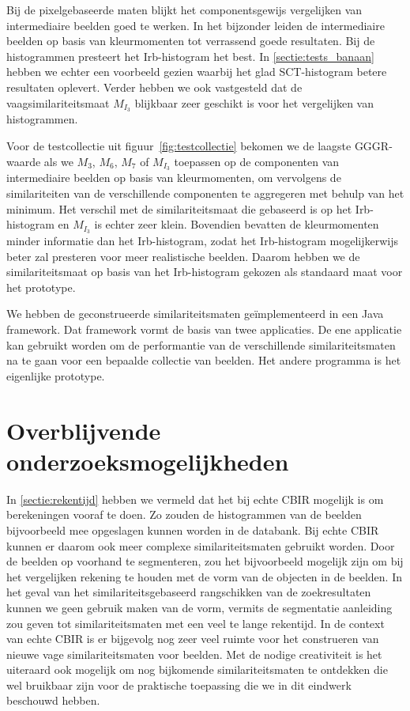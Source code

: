 Bij de pixelgebaseerde maten blijkt het componentsgewijs vergelijken van intermediaire
beelden goed te werken. In het bijzonder leiden de intermediaire beelden op basis van 
kleurmomenten tot verrassend goede resultaten. Bij de histogrammen presteert het 
Irb-histogram het best. In \ref{sectie:tests_banaan} hebben we echter een voorbeeld 
gezien waarbij het glad SCT-histogram betere resultaten oplevert. Verder hebben we
ook vastgesteld dat de vaagsimilariteitsmaat $M_{I_3}$ blijkbaar zeer 
geschikt is voor het vergelijken van histogrammen.

Voor de testcollectie uit figuur~\ref{fig:testcollectie} bekomen we de laagste 
GGGR-waarde als we $M_3$, $M_6$, $M_7$ of $M_{I_3}$ toepassen op 
de componenten
van intermediaire beelden op basis van kleurmomenten, om vervolgens de
similariteiten van de verschillende componenten te aggregeren met behulp van
het minimum. Het verschil met de 
similariteitsmaat die gebaseerd is op het Irb-histogram en $M_{I_3}$ is echter 
zeer klein. Bovendien bevatten de kleurmomenten minder informatie dan het
Irb-histogram, zodat het Irb-histogram mogelijkerwijs beter zal presteren voor
meer realistische beelden. Daarom hebben we de similariteitsmaat op basis
van het Irb-histogram gekozen als standaard maat voor het prototype.

We hebben de geconstrueerde similariteitsmaten ge\"implementeerd in een
Java framework. Dat framework vormt de basis van twee applicaties. De ene
applicatie kan gebruikt worden om de performantie van de
verschillende similariteitsmaten na te gaan voor een bepaalde collectie
van beelden. Het andere programma is het eigenlijke prototype.

\section{Overblijvende onderzoeksmogelijkheden}

In \ref{sectie:rekentijd} hebben we vermeld dat het bij echte CBIR mogelijk is
om berekeningen vooraf te doen. Zo zouden de histogrammen van de beelden
bijvoorbeeld mee opgeslagen kunnen worden in de databank. Bij echte CBIR kunnen
er daarom ook meer complexe similariteitsmaten gebruikt worden. Door de beelden
op voorhand te segmenteren, zou het bijvoorbeeld mogelijk zijn om bij het vergelijken
rekening te houden met de vorm van de objecten in de beelden. In het 
geval van het similariteitsgebaseerd rangschikken van de zoekresultaten kunnen we 
geen gebruik maken van de vorm, vermits de segmentatie aanleiding zou geven tot 
similariteitsmaten met een veel te lange rekentijd. In de context van echte CBIR is 
er bijgevolg nog zeer veel ruimte voor het construeren van nieuwe vage 
similariteitsmaten voor beelden. Met de nodige creativiteit is het uiteraard ook 
mogelijk om nog bijkomende similariteitsmaten te ontdekken die wel bruikbaar 
zijn voor de praktische toepassing die we in dit eindwerk beschouwd hebben.

